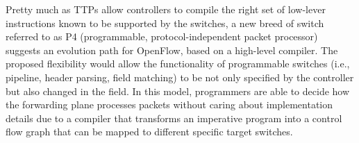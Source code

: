 Pretty much as TTPs allow controllers to compile the right set of low-lever instructions known to be supported by the switches, a new breed of switch referred to as P4 (programmable, protocol-independent packet
processor)~\cite{bosshart2013} suggests an evolution path for OpenFlow, based on a high-level compiler. 
 The proposed flexibility would allow the functionality of programmable switches (i.e., pipeline, header parsing, field matching) to be not only specified by the controller but also changed in the field. In this model, 
programmers are able to decide how the forwarding plane processes packets without caring about implementation details due to  a compiler that transforms an imperative program into a control flow graph that can be mapped to different specific target switches. 







